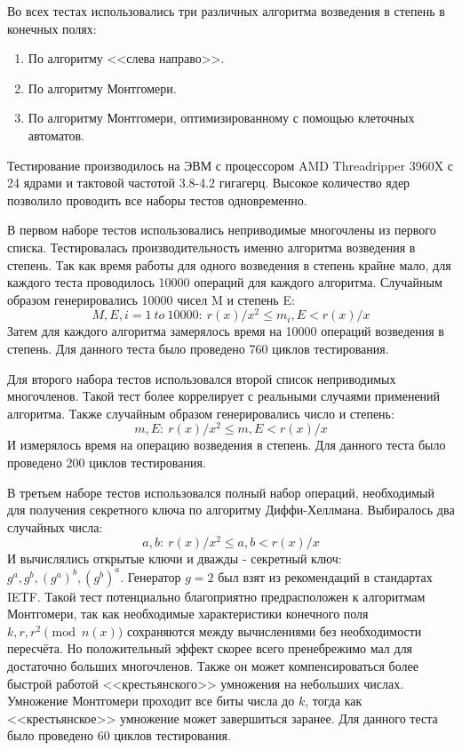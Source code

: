 \documentclass[times,specification,annotation]{itmo-student-thesis}
\begin{document}
Во всех тестах использовались три различных алгоритма возведения в степень в конечных полях:
\begin{enumerate}
  \item По алгоритму <<слева направо>>.
  \item По алгоритму Монтгомери.
  \item По алгоритму Монтгомери, оптимизированному с помощью клеточных автоматов.
\end{enumerate}

Тестирование производилось на ЭВМ с процессором AMD Threadripper 3960X с 24 ядрами и тактовой частотой 3.8-4.2 гигагерц.
Высокое количество ядер позволило проводить все наборы тестов одновременно.

В первом наборе тестов использовались неприводимые многочлены из первого списка.
Тестировалась производительность именно алгоритма возведения в степень.
Так как время работы для одного возведения в степень крайне мало, для каждого теста проводилось 10000 операций для
каждого алгоритма.
Случайным образом генерировались 10000 чисел M и степень E:
\[M, E, i = 1~to~10000:~r(x)/x^2 \leq m_i, E < r(x)/x\]
Затем для каждого алгоритма замерялось время на 10000 операций возведения в степень.
Для данного теста было проведено 760 циклов тестирования.

Для второго набора тестов использовался второй список неприводимых многочленов.
Такой тест более коррелирует с реальными случаями применений алгоритма.
Также случайным образом генерировались число и степень:
\[m, E:~r(x)/x^2 \leq m, E < r(x)/x\]
И измерялось время на операцию возведения в степень.
Для данного теста было проведено 200 циклов тестирования.

В третьем наборе тестов использовался полный набор операций, необходимый для получения секретного ключа по алгоритму Диффи-Хеллмана.
Выбиралось два случайных числа:
\[a, b:~r(x)/x^2 \leq a,b < r(x)/x\]
И вычислялись открытые ключи и дважды - секретный ключ: $g^a, g^b, (g^a)^b, (g^b)^a$.
Генератор $g = 2$ был взят из рекомендаций в стандартах IETF.
Такой тест потенциально благоприятно предрасположен к алгоритмам Монтгомери, так как необходимые характеристики конечного поля
$k, r, r^2 \pmod{n(x)}$ сохраняются между вычислениями без необходимости пересчёта.
Но положительный эффект скорее всего пренебрежимо мал для достаточно больших многочленов.
Также он может компенсироваться более быстрой работой <<крестьянского>> умножения на небольших числах.
Умножение Монтгомери проходит все биты числа до $k$, тогда как <<крестьянское>> умножение может завершиться заранее.
Для данного теста было проведено 60 циклов тестирования.
\end{document}
